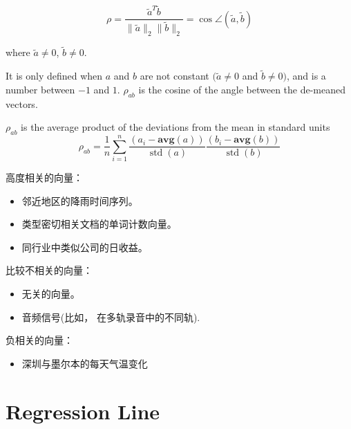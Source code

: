 \begin{definition}[$a$和$b$的相关系数]
    \begin{equation} \rho=\frac{\tilde{a}^{T} \tilde{b}}{\|\tilde{a}\|_{2}\|\tilde{b}\|_{2}} = \cos \angle (\tilde{a}, \tilde{b}) \end{equation}

    where  $ \tilde{a} \neq 0 $,  $ \tilde{b} \neq 0 $.
\end{definition}

It is only defined when $ a $ and $ b $ are not constant $ (\tilde{a} \neq 0 $ and $ \tilde{b} \neq 0) $, and is a number between $ -1 $ and $1$. $ \rho_{a b} $ is the cosine of the angle between the de-meaned vectors.

\begin{theorem}
    $ \rho_{a b} $ is the average product of the deviations from the mean in standard units
\begin{equation}
\rho_{a b}=\frac{1}{n} \sum_{i=1}^{n} \frac{\left(a_{i}-\mathbf{a v g}(a)\right)}{\operatorname{std}(a)} \frac{\left(b_{i}-\mathbf{a v g}(b)\right)}{\operatorname{std}(b)}
\end{equation}
\end{theorem}


\begin{example}
    高度相关的向量：
\begin{itemize}
    \item 邻近地区的降雨时间序列。 
    \item 类型密切相关文档的单词计数向量。 
    \item 同行业中类似公司的日收益。 
\end{itemize}

比较不相关的向量：
\begin{itemize}
    \item 无关的向量。 
    \item 音频信号(比如， 在多轨录音中的不同轨). 
\end{itemize}

负相关的向量：
\begin{itemize}
    \item 深圳与墨尔本的每天气温变化
\end{itemize}
\end{example}

\section{Regression Line}

